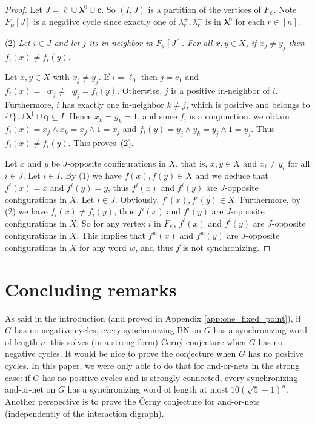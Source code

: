 \documentclass[11pt,letter]{article}
\newcommand{\q}{{\boldsymbol{q}}}
\newcommand{\LAMBDA}{\boldsymbol{\lambda}}
\newcommand{\ELL}{\boldsymbol{\ell}}
\newcommand{\C}{\boldsymbol{c}}
\begin{document}
\begin{proof}
\bigskip
Let $J=\ELL\cup\LAMBDA^0\cup\C$. So $(I,J)$ is a partition of the vertices of $F_\psi$. Note $F_\psi[J]$ is a negative cycle since exactly one of $\lambda^+_r,\lambda^-_r$ is in $\LAMBDA^0$ for each $r\in [n]$.   

\bigskip
\noindent
(2) {\em Let $i\in J$ and let $j$ its in-neighbor in $F_\psi[J]$. For all $x,y\in X$, if $x_j\neq y_j$ then $f_i(x)\neq f_i(y)$.}

\medskip
\noindent
Let $x,y\in X$ with $x_j\neq y_j$. If $i=\ell_0$ then $j=c_1$ and $f_i(x)=\neg x_j\neq \neg y_j=f_i(y)$. Otherwise, $j$ is a positive in-neighbor of $i$. Furthermore, $i$ has exactly one in-neighbor $k\neq j$, which is positive and belongs to $\{t\}\cup\LAMBDA^1\cup\q\subseteq I$. Hence $x_k=y_k=1$, and since $f_i$ is a conjunction, we obtain $f_i(x)=x_j\land x_k=x_j\land 1=x_j$ and $f_i(y)=y_j\land y_k=y_j\land 1=y_j$. Thus $f_i(x)\neq f_i(y)$. This proves~(2).

\bigskip
Let $x$ and $y$ be $J$-opposite configurations in $X$, that is, $x,y\in X$ and $x_i\neq y_i$ for all $i\in J$. Let $i\in I$. By (1) we have $f(x),f(y)\in X$ and we deduce that $f^i(x)=x$ and $f^i(y)=y$, thus $f^i(x)$ and $f^i(y)$ are $J$-opposite configurations in $X$. Let $i\in J$. Obviously,  $f^i(x),f^i(y)\in X$. Furthermore, by (2) we have $f_i(x)\neq f_i(y)$, thus $f^i(x)$ and $f^i(y)$ are $J$-opposite configurations in $X$. So for any vertex $i$ in $F_\psi$, $f^i(x)$ and $f^i(y)$ are $J$-opposite configurations in $X$. This implies that $f^w(x)$ and $f^w(y)$ are $J$-opposite configurations in $X$ for any word $w$, and thus $f$ is not synchronizing. 
\end{proof}

\section{Concluding remarks}\label{sec:conclu}

As said in the introduction (and proved in Appendix \ref{app:one_fixed_point}), if $G$ has no negative cycles, every synchronizing BN on $G$ has a synchronizing word of length $n$: this solves (in a strong form) \v{C}ern\'y conjecture when $G$ has no negative cycles. It would be nice to prove the conjecture when $G$ has no positive cycles. In this paper, we were only able to do that for and-or-nets in the strong case: if $G$ has no positive cycles and is strongly connected, every synchronizing and-or-net on $G$ has a synchronizing word of length at most $10(\sqrt{5}+1)^n$. Another perspective is to prove the \v{C}ern\'y conjecture for and-or-nets (independently of the interaction digraph).  
\end{document}
